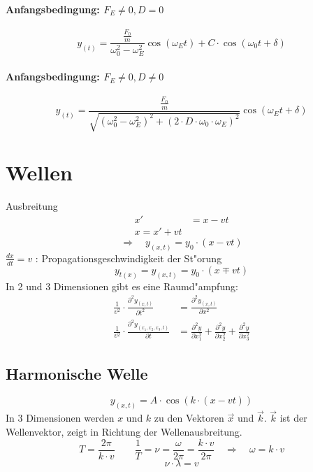 \paragraph{Anfangsbedingung: $F_E\neq0, D=0$}
\begin{equation}
	y_{(t)}=\frac{\frac{F_0}{m}}{\omega_0^2-\omega_E^2}\cos(\omega_E t)+C\cdot\cos(\omega_0 t+\delta)
\end{equation}

\paragraph{Anfangsbedingung: $F_E\neq0, D\neq0$}
\begin{equation}
	y_{(t)}=\frac{\frac{F_0}{m}}{\sqrt{(\omega_0^2-\omega_E^2)^2+(2\cdot D\cdot\omega_0\cdot\omega_E)^2}}\cos(\omega_E t+\delta)
\end{equation}

\section{Wellen}
Ausbreitung
\begin{align*}
	x' &= x-vt \\
	x = x' + vt
\end{align*}
\begin{equation}
	\Longrightarrow\quad y_{(x,t)}=y_0\cdot(x-vt)
\end{equation}
\noindent $\frac{dx}{dt}=v$ : Propagationsgeschwindigkeit der St"orung
\begin{equation*}
	y_{t(x)}=y_{(x,t)}=y_0\cdot(x\mp vt)
\end{equation*}
\noindent In 2 und 3 Dimensionen gibt es eine Raumd"ampfung:
\begin{align}
	\frac{1}{v^2}\cdot\frac{\partial^2 y_{(x,t)}}{\partial t^2} &= \frac{\partial^2 y_{(x,t)}}{\partial x^2} \\
	\frac{1}{v^2}\cdot\frac{\partial^2 y_{(x_1,x_2,x_3,t)}}{\partial t} &= \frac{\partial^2 y}{\partial x_1^2}+\frac{\partial^2 y}{\partial x_2^2}+\frac{\partial^2 y}{\partial x_3^2}
\end{align}

\subsection{Harmonische Welle}
\begin{equation}
	y_{(x,t)}=A\cdot\cos\left(k\cdot(x-vt)\right)
\end{equation}
\noindent In 3 Dimensionen werden $x$ und $k$ zu den Vektoren $\overrightarrow{x}$ und $\overrightarrow{k}$. $\overrightarrow{k}$ ist der Wellenvektor, zeigt in Richtung der Wellenausbreitung.
\begin{equation}
	T=\frac{2\pi}{k\cdot v}\qquad\frac{1}{T}=\nu=\frac{\omega}{2\pi}=\frac{k\cdot v}{2\pi}\quad\Longrightarrow\quad\omega=k\cdot v
\end{equation}
\begin{equation}
	\nu\cdot\lambda=v
\end{equation}

